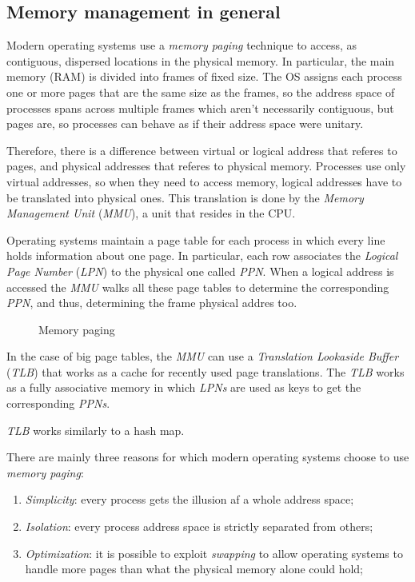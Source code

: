\subsection{Memory management in general}
Modern operating systems use a \emph{memory paging} technique to access, as
contiguous, dispersed locations in the physical memory. In particular, the main
memory (RAM) is divided into frames of fixed size. The OS assigns each process
one or more pages that are the same size as the frames, so the address space of
processes spans across multiple frames which aren't necessarily contiguous, but
pages are, so processes can behave as if their address space were unitary.

Therefore, there is a difference between virtual or logical address that referes
to pages, and physical addresses that referes to physical memory. Processes
use only virtual addresses, so when they need to access memory, logical addresses
have to be translated into physical ones. This translation is done by the
\emph{Memory Management Unit} (\emph{MMU}), a unit that resides in the CPU.

Operating systems maintain a page table for each process in which every line
holds information about one page. In particular, each row associates the
\emph{Logical Page Number} (\emph{LPN}) to the physical one called \emph{PPN}.
When a logical address is accessed the \emph{MMU} walks all these page tables
to determine the corresponding \emph{PPN}, and thus, determining the frame physical
addres too.

\begin{figure}[h!]
    \centering
    \caption{Memory paging}
\end{figure}

\noindent
In the case of big page tables, the \emph{MMU} can use a \emph{Translation
Lookaside Buffer} (\emph{TLB}) that works as a cache for recently used page
translations. The \emph{TLB} works as a fully associative memory in which
\emph{LPNs} are used as keys to get the corresponding \emph{PPNs}.
\begin{note}
    \emph{TLB} works similarly to a hash map.
\end{note}

\noindent
There are mainly three reasons for which modern operating systems choose to use
\emph{memory paging}:
\begin{enumerate}
    \item \emph{Simplicity}: every process gets the illusion af a whole address
    space;
    \item \emph{Isolation}: every process address space is strictly separated
    from others;
    \item \emph{Optimization}: it is possible to exploit \emph{swapping} to allow
    operating systems to handle more pages than what the physical memory alone
    could hold;
\end{enumerate}


